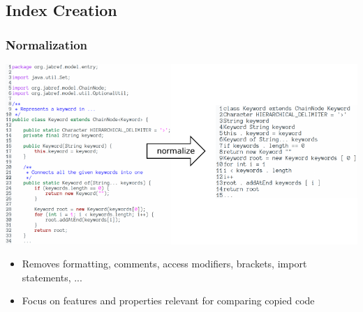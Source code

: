 \subsection{Index Creation}
\subsubsection{Normalization}
\begin{frame}{\insertsubsection}{\insertsubsubsection}
	\begin{center}
		\includegraphics[width=0.9\linewidth]{fig/normalization_1.pdf}
	\end{center}
	\begin{itemize}
		\small
		\item Removes formatting, comments, access modifiers, brackets, import statements, ...
		\item Focus on features and properties relevant for comparing copied code
	\end{itemize}

\end{frame}

